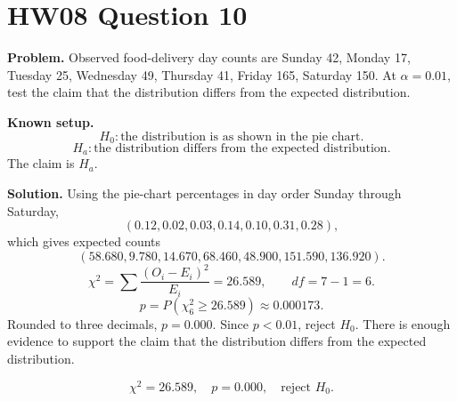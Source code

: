 \documentclass[11pt]{article}
\begin{document}
\section*{HW08 Question 10}

\textbf{Problem.} Observed food-delivery day counts are Sunday 42, Monday 17, Tuesday 25, Wednesday 49, Thursday 41, Friday 165, Saturday 150. At \(\alpha=0.01\), test the claim that the distribution differs from the expected distribution.

\textbf{Known setup.}
\[
H_0:\text{the distribution is as shown in the pie chart.}
\]
\[
H_a:\text{the distribution differs from the expected distribution.}
\]
The claim is \(H_a\).

\textbf{Solution.} Using the pie-chart percentages in day order Sunday through Saturday,
\[
(0.12,0.02,0.03,0.14,0.10,0.31,0.28),
\]
which gives expected counts
\[
(58.680,9.780,14.670,68.460,48.900,151.590,136.920).
\]
\[
\chi^2=\sum\frac{(O_i-E_i)^2}{E_i}=26.589,\qquad df=7-1=6.
\]
\[
p=P(\chi^2_6\ge26.589)\approx0.000173.
\]
Rounded to three decimals, \(p=0.000\). Since \(p<0.01\), reject \(H_0\). There is enough evidence to support the claim that the distribution differs from the expected distribution.

\[
\boxed{\chi^2=26.589,\quad p=0.000,\quad \text{reject }H_0.}
\]
\end{document}
